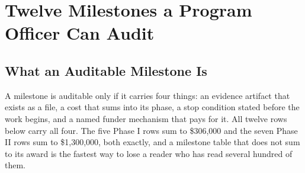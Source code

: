 \section{Twelve Milestones a Program Officer Can Audit}

\subsection{What an Auditable Milestone Is}

A milestone is auditable only if it carries four things: an evidence artifact
that exists as a file, a cost that sums into its phase, a stop condition stated
before the work begins, and a named funder mechanism that pays for it. All
twelve rows below carry all four. The five Phase I rows sum to \$306,000 and the
seven Phase II rows sum to \$1,300,000, both exactly, and a milestone table that
does not sum to its award is the fastest way to lose a reader who has read
several hundred of them.

